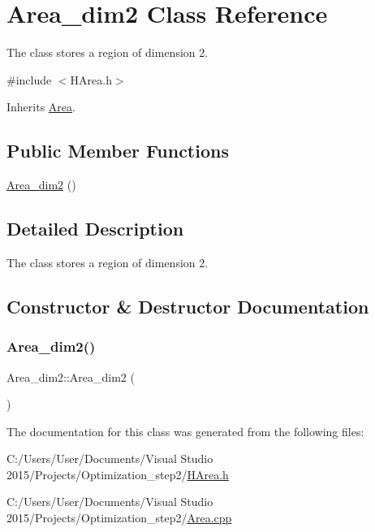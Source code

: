 \hypertarget{class_area__dim2}{}\section{Area\+\_\+dim2 Class Reference}
\label{class_area__dim2}


The class stores a region of dimension 2.  




{\ttfamily \#include $<$H\+Area.\+h$>$}



Inherits \hyperlink{class_area}{Area}.

\subsection*{Public Member Functions}
\begin{DoxyCompactItemize}
\item 
\hyperlink{class_area__dim2_ad3f92c011e9744dce20da53cfac8a80d}{Area\+\_\+dim2} ()
\end{DoxyCompactItemize}


\subsection{Detailed Description}
The class stores a region of dimension 2. 

\subsection{Constructor \& Destructor Documentation}
\mbox{\label{class_area__dim2_ad3f92c011e9744dce20da53cfac8a80d}} 
\subsubsection{\texorpdfstring{Area\+\_\+dim2()}{Area\_dim2()}}
{\footnotesize\ttfamily Area\+\_\+dim2\+::\+Area\+\_\+dim2 (\begin{DoxyParamCaption}{ }\end{DoxyParamCaption})}



The documentation for this class was generated from the following files\+:\begin{DoxyCompactItemize}
\item 
C\+:/\+Users/\+User/\+Documents/\+Visual Studio 2015/\+Projects/\+Optimization\+\_\+step2/\hyperlink{_h_area_8h}{H\+Area.\+h}\item 
C\+:/\+Users/\+User/\+Documents/\+Visual Studio 2015/\+Projects/\+Optimization\+\_\+step2/\hyperlink{_area_8cpp}{Area.\+cpp}\end{DoxyCompactItemize}
